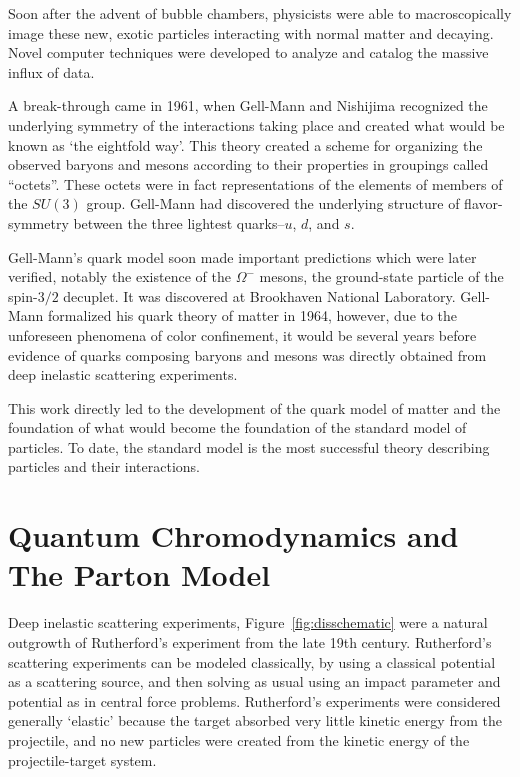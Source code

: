 Soon after the advent of bubble chambers, physicists were able to
macroscopically image these new, exotic particles interacting with normal matter
and decaying. Novel computer techniques were developed to analyze and catalog
the massive influx of data.

A break-through came in 1961, when Gell-Mann and Nishijima recognized the
underlying symmetry of the interactions taking place and created what would be
known as `the eightfold way'. This theory created a scheme for organizing the
observed baryons and mesons according to their properties in groupings called
``octets''. These octets were in fact representations of the elements of members
of the $SU(3)$ group. Gell-Mann had discovered the underlying structure of
flavor-symmetry between the three lightest quarks--$u$, $d$, and $s$. 

Gell-Mann's quark model soon made important predictions which were later
verified, notably the existence of the $\Omega^{-}$ mesons, the ground-state
particle of the spin-$3/2$ decuplet. It was discovered at Brookhaven National
Laboratory. Gell-Mann formalized his quark theory of matter in 1964, however,
due to the unforeseen phenomena of color confinement, it would be several years
before evidence of quarks composing baryons and mesons was directly obtained
from deep inelastic scattering experiments.

This work directly led to the development of the quark model of matter and the
foundation of what would become the foundation of the standard model of
particles. To date, the standard model is the most successful theory describing
particles and their interactions.


\clearpage
\section{Quantum Chromodynamics and The Parton Model}

Deep inelastic scattering experiments, Figure~\ref{fig:disschematic} were a
natural outgrowth of Rutherford's experiment from the late 19th century.
Rutherford's scattering experiments can be modeled classically, by using a
classical potential as a scattering source, and then solving as usual using an
impact parameter and potential as in central force problems.  Rutherford's
experiments were considered generally `elastic' because the target absorbed very
little kinetic energy from the projectile, and no new particles were created
from the kinetic energy of the projectile-target system.

